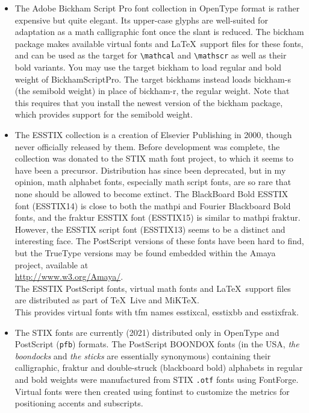 \documentclass[11pt]{article}
\begin{document}
\begin{itemize}
\item The Adobe Bickham Script Pro font collection in OpenType format is rather expensive but quite elegant. Its upper-case glyphs are well-suited for adaptation as a math calligraphic font once the slant is reduced. The \textsf{bickham} package makes available virtual fonts and \LaTeX\ support files for these fonts, and can be used as the target for \verb|\mathcal| and \verb|\mathscr| as well as their bold variants. You may use the target \textsf{bickham} to load regular and bold weight of BickhamScriptPro. The target \textsf{bickhams} instead loads \textsf{bickham-s} (the semibold weight) in place of \textsf{bickham-r}, the regular weight. Note that this requires that you install the newest version of the \textsf{bickham} package, which provides support for the semibold weight.
\item The ESSTIX collection is a creation of Elsevier Publishing in 2000, though never officially released by them. Before development was complete, the collection was donated to the STIX math font project, to which it seems to have been a precursor. Distribution has since been deprecated, but in my opinion, math alphabet fonts, especially math script fonts,  are so rare that none should be allowed to become extinct. The BlackBoard Bold ESSTIX font (\textsf{ESSTIX14}) is  close to both the mathpi and Fourier Blackboard Bold fonts, and the fraktur ESSTIX font (\textsf{ESSTIX15}) is  similar to mathpi fraktur. However, the ESSTIX script font (\textsf{ESSTIX13}) seems to be a distinct and interesting face. The PostScript versions of these fonts have been  hard to find, but the TrueType versions may be found embedded within the \textsf{Amaya} project, available at\\
\url{http://www.w3.org/Amaya/}.\\
    The ESSTIX PostScript fonts, virtual math fonts  and \LaTeX\ support files are distributed  as part of \TeX\ Live and MiKTeX.\\
This provides virtual fonts with tfm names \textsf{esstixcal}, \textsf{esstixbb} and \textsf{esstixfrak}. 
\item The STIX fonts are currently (2021) distributed only in OpenType and PostScript ({\tt pfb}) formats. The PostScript BOONDOX fonts (in the USA, \emph{the boondocks} and \emph{the sticks} are essentially synonymous) containing their  calligraphic, fraktur and double-struck (blackboard bold) alphabets in regular and bold weights were manufactured from STIX {\tt.otf} fonts using \textsf{FontForge}. Virtual fonts were then created using \textsf{fontinst} to customize the metrics for positioning accents and subscripts.

\end{itemize}
\end{document}
